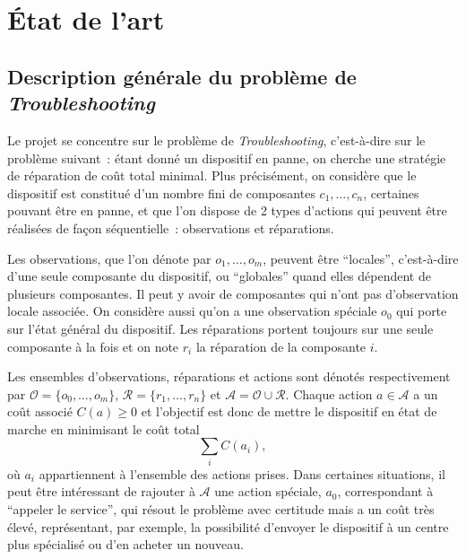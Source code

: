 \documentclass[a4paper,11pt]{article}
\theoremstyle{plain}
\begin{document}


\pagestyle{plain}




\section{État de l'art}

\subsection{Description générale du problème de \emph{Troubleshooting}}

Le projet se concentre sur le problème de \emph{Troubleshooting}, c'est-à-dire sur le problème suivant~: étant donné un dispositif en panne, on cherche une stratégie de réparation de coût total minimal. Plus précisément, on considère que le dispositif est constitué d'un nombre fini de composantes $c_1, \dotsc, c_n$, certaines pouvant être en panne, et que l'on dispose de 2 types d'actions qui peuvent être réalisées de façon séquentielle~: observations et réparations. 

Les observations, que l'on dénote par $o_1, \dotsc, o_m$,  peuvent être ``locales'', c'est-à-dire d'une seule composante du dispositif, ou ``globales'' quand elles dépendent de plusieurs composantes. Il peut y avoir de composantes qui n'ont pas d'observation locale associée. On considère aussi qu'on a une observation spéciale $o_0$ qui porte sur l'état général du dispositif. Les réparations portent toujours sur une seule composante à la fois et on note $r_i$ la réparation de la composante $i$. 

Les ensembles d'observations, réparations et actions sont dénotés respectivement par $\mathcal O = \{ o_0, \dotsc, o_m\}$, $\mathcal R = \{r_1, \dotsc, r_n\}$ et $\mathcal A = \mathcal O \cup \mathcal R$. Chaque action $a \in \mathcal A$ a un coût associé $C(a) \geq 0$ et l'objectif est donc de mettre le dispositif en état de marche en minimisant le coût total \[\sum_i C(a_i),\] où $a_i$ appartiennent à l'ensemble des actions prises. Dans certaines situations, il peut être intéressant de rajouter à $\mathcal A$ une action spéciale, $a_0$, correspondant à ``appeler le service'', qui résout le problème avec certitude mais a un coût très élevé, représentant, par exemple, la possibilité d'envoyer le dispositif à un centre plus spécialisé ou d'en acheter un nouveau.
\end{document}
